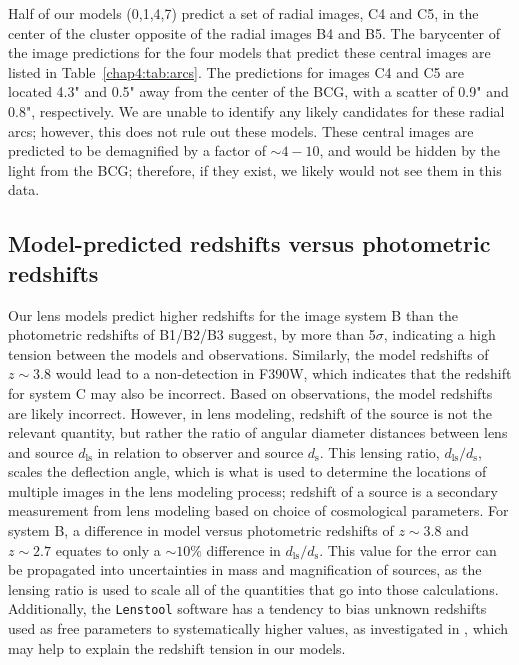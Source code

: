 Half of our models (0,1,4,7) predict a set of radial images, C4 and C5, in the center of the cluster opposite of the radial images B4 and B5. The barycenter of the image predictions for the four models that predict these central images are listed in Table~\ref{chap4:tab:arcs}. The predictions for images C4 and C5 are located 4.3" and 0.5" away from the center of the BCG, with a scatter of 0.9" and 0.8", respectively. We are unable to identify any likely candidates for these radial arcs; however, this does not rule out these models. These central images are predicted to be demagnified by a factor of $\sim4-10$, and would be hidden by the light from the BCG; therefore, if they exist, we likely would not see them in this data.

\subsection{Model-predicted redshifts versus photometric redshifts}
\label{chap4:subsec:model_redshifts}
Our lens models predict higher redshifts for the image system B than the photometric redshifts of B1/B2/B3 suggest, by more than 5$\sigma$, indicating a high tension between the models and observations. Similarly, the model redshifts of $z\sim3.8$ would lead to a non-detection in F390W, which indicates that the redshift for system C may also be incorrect. Based on observations, the model redshifts are likely incorrect. However, in lens modeling, redshift of the source is not the relevant quantity, but rather the ratio of angular diameter distances between lens and source $d_\mathrm{ls}$ in relation to observer and source $d_\mathrm{s}$. This lensing ratio, $d_\mathrm{ls}/d_\mathrm{s}$, scales the deflection angle, which is what is used to determine the locations of multiple images in the lens modeling process; redshift of a source is a secondary measurement from lens modeling based on choice of cosmological parameters. For system B, a difference in model versus photometric redshifts of $z\sim3.8$ and $z\sim2.7$ equates to only a $\sim10\%$ difference in $d_\mathrm{ls}/d_\mathrm{s}$. This value for the error can be propagated into uncertainties in mass and magnification of sources, as the lensing ratio is used to scale all of the quantities that go into those calculations. Additionally, the \texttt{Lenstool} software has a tendency to bias unknown redshifts used as free parameters to systematically higher values, as investigated in \citet{Johnson:2016rt}, which may help to explain the redshift tension in our models.

